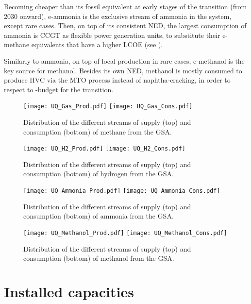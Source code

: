 Becoming cheaper than its fossil equivalent at early stages of the transition (\ie from 2030 onward), e-ammonia is the exclusive stream of ammonia in the system, except rare cases. Then, on top of its consistent \gls{NED}, the largest consumption of ammonia is \gls{CCGT} as flexible power generation units, to substitute their e-methane equivalents that have a higher \gls{LCOE} (see ).

Similarly to ammonia, on top of local production in rare cases, e-methanol is the key source for methanol. Besides its own \gls{NED}, methanol is mostly consumed to produce \gls{HVC} via the \gls{MTO} process instead of naphtha-cracking, in order to respect to -budget for the transition.

\begin{figure}[htbp!]
\centering
\texttt{[image: UQ\_Gas\_Prod.pdf]}
\texttt{[image: UQ\_Gas\_Cons.pdf]}
\caption{Distribution of the different streams of supply (top) and consumption (bottom) of methane from the \acrfull{GSA}.}
\label{fig:results_uq_prod_cons_Gas}
\end{figure}

\begin{figure}[htbp!]
\centering
\texttt{[image: UQ\_H2\_Prod.pdf]}
\texttt{[image: UQ\_H2\_Cons.pdf]}
\caption{Distribution of the different streams of supply (top) and consumption (bottom) of hydrogen from the \acrfull{GSA}.}
\label{fig:results_uq_prod_cons_H2}
\end{figure}

\begin{figure}[htbp!]
\centering
\texttt{[image: UQ\_Ammonia\_Prod.pdf]}
\texttt{[image: UQ\_Ammonia\_Cons.pdf]}
\caption{Distribution of the different streams of supply (top) and consumption (bottom) of ammonia from the \acrfull{GSA}.}
\label{fig:results_uq_prod_cons_Ammonia}
\end{figure}

\begin{figure}[htbp!]
\centering
\texttt{[image: UQ\_Methanol\_Prod.pdf]}
\texttt{[image: UQ\_Methanol\_Cons.pdf]}
\caption{Distribution of the different streams of supply (top) and consumption (bottom) of methanol from the \acrfull{GSA}.}
\label{fig:results_uq_prod_cons_Methanol}
\end{figure}

\newpage
\section{Installed capacities}
\label{app:UQ_tech_cap}


